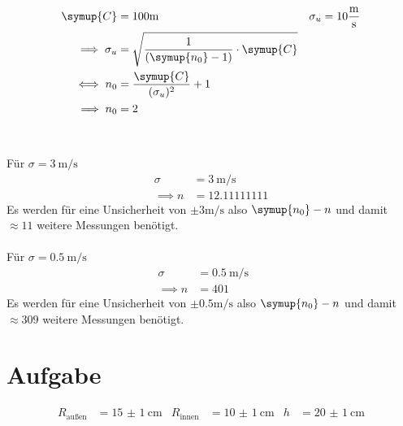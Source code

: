         \begin{align}  
            \symup{C}&=100\si{\metre} & \sigma_u &= 10 \si{\metre\per\second}\\
            \implies \sigma_u &= \sqrt{ \frac{1}{(\symup{n_0}-1)} \cdot \symup{C}}\\
            \iff n_0 &= \frac{\symup{C}}{( \sigma_u)^2}+1\\
            \implies n_0 &= 2
        \end{align}
        \\
        \\  
        Für $ \sigma =\SI{3}{\metre\per\second} $
        \begin{align}
            \sigma &= \SI{3}{\metre\per\second}\\
            \implies  n &= 12.11111111 
        \end{align}
        Es werden für eine Unsicherheit von  $\pm 3 \si{\metre\per\second}$ also $\symup{n_0}-n $ und damit $\approx 11$ weitere Messungen benötigt.
         \\
         \\
        Für  $\sigma = \SI{0.5}{\metre\per\second}$ 
        \begin{align}
            \sigma &= \SI{0.5}{\metre\per\second}\\
            \implies n &= 401 \quad \quad \; \; \; \;
        \end{align}
        Es werden für eine Unsicherheit von $\pm 0.5\si{\metre\per\second}$ also $\symup{n_0}-n$ und damit $\approx 309$ weitere Messungen benötigt.

        \section{Aufgabe}

        \begin{align}
            R_\text{außen}&= \SI{15(1)}{\centi\metre} & R_\text{innen}&=\SI{10(1)}{\centi\metre} & h&=\SI{20(1)}{\centi\metre} 
        \end{align}

